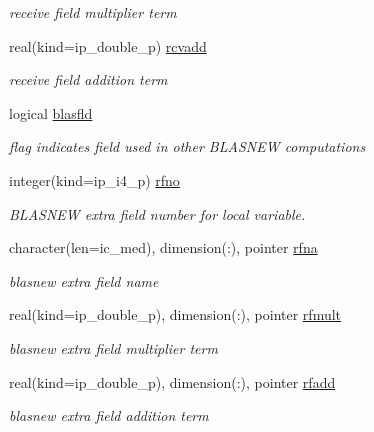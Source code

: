 \begin{DoxyCompactItemize}
\begin{DoxyCompactList}\small\item\em receive field multiplier term \end{DoxyCompactList}\item 
real(kind=ip\+\_\+double\+\_\+p) \hyperlink{structmod__oasis__coupler_1_1prism__coupler__type_adee95ace457db5ccaacc0195f3327277}{rcvadd}
\begin{DoxyCompactList}\small\item\em receive field addition term \end{DoxyCompactList}\item 
logical \hyperlink{structmod__oasis__coupler_1_1prism__coupler__type_afe5c43fd5b563dbdab9a6a6d27415206}{blasfld}
\begin{DoxyCompactList}\small\item\em flag indicates field used in other B\+L\+A\+S\+N\+EW computations \end{DoxyCompactList}\item 
integer(kind=ip\+\_\+i4\+\_\+p) \hyperlink{structmod__oasis__coupler_1_1prism__coupler__type_a297ff604ac6fbb83cf560e638e649005}{rfno}
\begin{DoxyCompactList}\small\item\em B\+L\+A\+S\+N\+EW extra field number for local variable. \end{DoxyCompactList}\item 
character(len=ic\+\_\+med), dimension(\+:), pointer \hyperlink{structmod__oasis__coupler_1_1prism__coupler__type_a1c7b29a73f66c38c1f4d2b8411cfb9cb}{rfna}
\begin{DoxyCompactList}\small\item\em blasnew extra field name \end{DoxyCompactList}\item 
real(kind=ip\+\_\+double\+\_\+p), dimension(\+:), pointer \hyperlink{structmod__oasis__coupler_1_1prism__coupler__type_a7b756410acbdc46690167c0ab8863630}{rfmult}
\begin{DoxyCompactList}\small\item\em blasnew extra field multiplier term \end{DoxyCompactList}\item 
real(kind=ip\+\_\+double\+\_\+p), dimension(\+:), pointer \hyperlink{structmod__oasis__coupler_1_1prism__coupler__type_a337fc7968366689769de6e84a6cc49b8}{rfadd}
\begin{DoxyCompactList}\small\item\em blasnew extra field addition term \end{DoxyCompactList}\item 

\end{DoxyCompactItemize}

